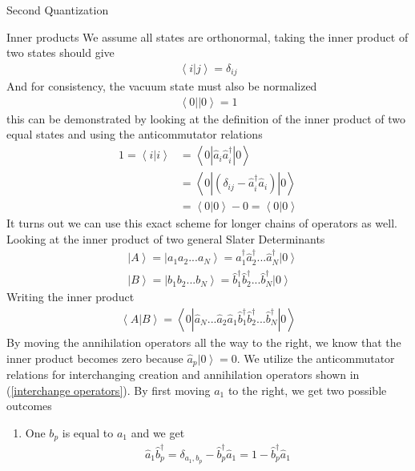 \documentclass[twoside,english]{uiofysmaster}
\begin{document}
\begin{chapter}{Second Quantization}
	\begin{section}{Inner products}
		We assume all states are orthonormal, taking the inner product of two states should give
		\begin{align}
			\left< i | j \right> = \delta_{ij}
		\end{align}
		And for consistency, the vacuum state must also be normalized
		\begin{align}
			\left< 0 | | 0 \right> = 1
		\end{align}
		this can be demonstrated by looking at the definition of the inner product of two equal states and using the anticommutator relations
		\begin{align}
			1 = \left< i | i \right> &= \left< 0 | \hat a_i \hat a_i^\dagger | 0 \right> \\
									 &= \left< 0 | (\delta_{ij} - \hat a_i^\dagger \hat a_i) | 0 \right> \\
									 &= \left< 0 | 0 \right> - 0 = \left< 0 | 0 \right>
		\end{align}
		It turns out we can use this exact scheme for longer chains of operators as well. Looking at the inner product of two general Slater Determinants
		\begin{align}
			&\left| A \right> = \left| a_1 a_2 ... a_N \right> = \hat a_1^\dagger \hat a_2^\dagger ... \hat a_N^\dagger \left| 0 \right> \\
			&\left| B \right> = \left| b_1 b_2 ... b_N \right> = \hat b_1^\dagger \hat b_2^\dagger ... \hat b_N^\dagger \left| 0 \right>
		\end{align}
		Writing the inner product
		\begin{align}
			\left< A | B \right> = \left< 0 | \hat a_N ... \hat a_2 \hat a_1 \hat b_1^\dagger \hat b_2^\dagger ... \hat b_N^\dagger | 0 \right>
		\end{align}
		By moving the annihilation operators all the way to the right, we know that the inner product becomes zero because $\hat a_p \left| 0 \right> = 0$. We utilize the anticommutator relations for interchanging creation and annihilation operators shown in (\ref{interchange operators}). By first moving $a_1$ to the right, we get two possible outcomes
		\begin{enumerate} 
			\item One $b_p$ is equal to $a_1$ and we get
			\begin{align}
				\hat a_1 \hat b_p^\dagger = \delta_{a_1,b_p} - \hat b_p^\dagger \hat a_1 = 1 - \hat b_p^\dagger \hat a_1 
				\label{InnerProduct1}
			\end{align}

\end{enumerate}
\end{section}
\end{chapter}
\end{document}
